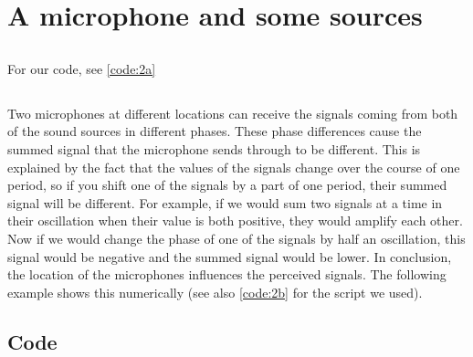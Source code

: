 \documentclass{article}
\begin{document}
\newpage

\section{A microphone and some sources}
\subsection{}
For our code, see \autoref{code:2a}

\subsection{}
Two microphones at different locations can receive the signals coming from both of the sound sources in different phases. These phase differences cause the summed signal that the 
microphone sends through to be different. This is explained by the fact that the values of the signals change over the course of one period, so if you shift one of the signals by a part of 
one period, their summed signal will be different. For example,
if we would sum two signals at a time in their oscillation when their value is both positive, they would amplify each other. Now if we would change the phase of one of the signals 
by half an oscillation, this signal would be negative and the summed signal would be lower. In conclusion, the location of the microphones influences the perceived signals.
The following example shows this numerically (see also \autoref{code:2b} for the script we used).


\begin{appendices}
\section{Code}




\end{appendices}
\end{document}
